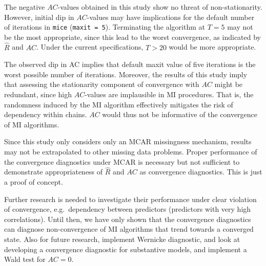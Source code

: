 \documentclass[Royal,times,sageh]{sagej}
\begin{document}
The negative \(AC\)-values obtained in this study show no threat of
non-stationarity. However, initial dip in \(AC\)-values may have
implications for the default number of iterations in \texttt{mice}
(\texttt{maxit\ =\ 5}). Terminating the algorithm at \(T=5\) may not be
the most appropriate, since this lead to the worst convergence, as
indicated by \(\widehat{R}\) and \(AC\). Under the current
specifications, \(T>20\) would be more appropriate.

The observed dip in AC implies that default maxit value of five
iterations is the worst possible number of iterations. Moreover, the
results of this study imply that assessing the stationarity component of
convergence with \(AC\) might be redundant, since high \(AC\)-values are
implausible in MI procedures. That is, the randomness induced by the MI
algorithm effectively mitigates the risk of dependency within chains.
\(AC\) would thus not be informative of the convergence of MI
algorithms.

Since this study only considers only an MCAR missingness mechanism,
results may not be extrapolated to other missing data problems. Proper
performance of the convergence diagnostics under MCAR is necessary but
not sufficient to demonstrate appropriateness of \(\widehat{R}\) and
\(AC\) as convergence diagnostics. This is just a proof of concept.

Further research is needed to investigate their performance under clear
violation of convergence, e.g.~dependency between predictors (predictors
with very high correlations). Until then, we have only shown that the
convergence diagnostics can diagnose non-convergence of MI algorithms
that trend towards a converged state. Also for future research,
implement Wernicke diagnostic, and look at developing a convergence
diagnostic for substantive models, and implement a Wald test for
\(AC = 0\).



\end{document}
